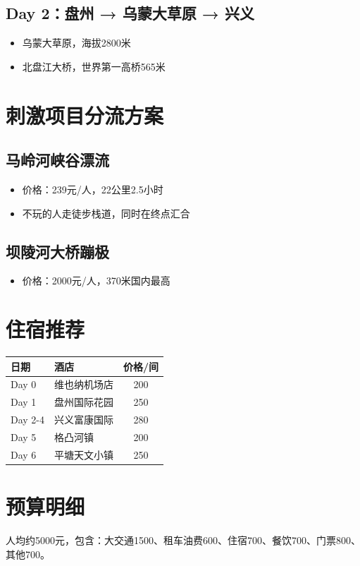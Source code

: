 \documentclass[12pt,a4paper,UTF8]{ctexart}
\begin{document}
\subsection{Day 2：盘州 → 乌蒙大草原 → 兴义}
\begin{itemize}
\item 乌蒙大草原，海拔2800米
\item 北盘江大桥，世界第一高桥565米
\end{itemize}

\section{刺激项目分流方案}

\subsection{马岭河峡谷漂流}
\begin{itemize}
\item 价格：239元/人，22公里2.5小时
\item 不玩的人走徒步栈道，同时在终点汇合
\end{itemize}

\subsection{坝陵河大桥蹦极}
\begin{itemize}
\item 价格：2000元/人，370米国内最高
\end{itemize}

\section{住宿推荐}

\begin{table}[h]
\centering
\begin{tabular}{llc}
\toprule
日期 & 酒店 & 价格/间 \\
\midrule
Day 0 & 维也纳机场店 & 200 \\
Day 1 & 盘州国际花园 & 250 \\
Day 2-4 & 兴义富康国际 & 280 \\
Day 5 & 格凸河镇 & 200 \\
Day 6 & 平塘天文小镇 & 250 \\
\bottomrule
\end{tabular}
\end{table}

\section{预算明细}
人均约5000元，包含：大交通1500、租车油费600、住宿700、餐饮700、门票800、其他700。
\end{document}
